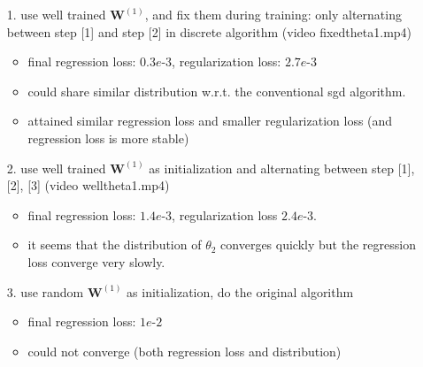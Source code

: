 \documentclass{article}
\newcommand{\vW}{{\mathbf{W}}}
\begin{document}
\begin{itemize}
    \item[1.] use well trained $\vW^{(1)}$, and fix them during training: only alternating between step [1] and step [2] in discrete algorithm (video fixedtheta1.mp4)
        \begin{itemize}
            \item final regression loss: $0.3e$-$3$, regularization loss: $2.7e$-$3$
            \item could share similar distribution w.r.t. the conventional sgd algorithm.
            \item attained similar regression loss and smaller regularization loss (and regression loss is more stable)
        \end{itemize}
    \item[2.] use well trained $\vW^{(1)}$ as initialization and alternating between step [1], [2], [3] (video welltheta1.mp4)
        \begin{itemize}
            \item final regression loss: $1.4e$-$3$, regularization loss $2.4e$-$3$.
            \item it seems that the distribution of $\theta_2$ converges quickly but the regression loss converge very slowly.
        \end{itemize}
    \item[3.] use random $\vW^{(1)}$ as initialization, do the original algorithm
        \begin{itemize}
            \item final regression loss: $1e$-$2$
            \item could not converge (both regression loss and distribution)
        \end{itemize}
\end{itemize}
\end{document}
